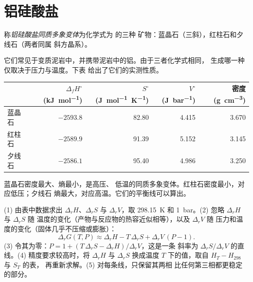 \section{铝硅酸盐}\label{sec:b2:metamorphic-facies:al2sio5}

\begin{definition}[铝硅酸盐同质多象变体]\label{def:b2:metamorphic-facies:al2sio5}
称\emph{铝硅酸盐同质多象变体}为化学式为  的三种
矿物：蓝晶石（三斜），红柱石和夕线石（两者同属
斜方晶系）。
\end{definition}

它们常见于变质泥岩中，并携带泥岩中的铝。由于三者化学式相同，
生成哪一种仅取决于压力与温度。下表
给出了它们的实测性质。

\begin{center}
\small
\begin{tabular}{@{}lrrrr@{}}
\hline
 & $\Delta_f H^\circ$ (\unit{kJ.mol^{-1}}) & $S^\circ$ (\unit{J.mol^{-1}.K^{-1}}) & $V^\circ$ (\unit{J.bar^{-1}}) & 密度 (\unit{g.cm^{-3}})\\
\hline
蓝晶石 & $-2593.8$ & 82.80 & 4.415 & 3.670\\
红柱石 & $-2589.9$ & 91.39 & 5.152 & 3.145\\
夕线石 & $-2586.1$ & 95.40 & 4.986 & 3.250\\
\hline
\end{tabular}
\par{}
\end{center}

蓝晶石密度最大、熵最小，是高压、
低温的同质多象变体。红柱石密度最小，对应低压；夕线石
熵最大，对应高温。它们的平衡线可以算出。

\begin{method}[计算反应线]\label{met:b2:metamorphic-facies:line}
(1) 由表中数据求出 $\Delta_r H$、$\Delta_r S$ 与 $\Delta_r V$，取 \qty{298.15}{K}
和 \qty{1}{bar}。(2) 忽略 $\Delta_r H$ 与 $\Delta_r S$ 随
温度的变化（产物与反应物的热容近似相等），以及 $\Delta_r V$ 随
压力和温度的变化（固体几乎不压缩或膨胀）：
\[
\Delta_r G(T, P) \approx \Delta_r H - T\,\Delta_r S + \Delta_r V\,(P - 1).
\]
(3) 令其为零：$P = 1 + (T\,\Delta_r S - \Delta_r H)/\Delta_r V$，这是一条
斜率为 $\Delta_r S/\Delta_r V$ 的直线。(4) 精度要求较高时，将 $\Delta_r H$ 与
$\Delta_r S$ 换成温度 $T$ 下的值，取自 $H_T - H_{298}$ 与 $S_T$ 的表，
再重新求解。(5) 对每条线，只保留其两相
比任何第三相都更稳定的部分。
\end{method}


